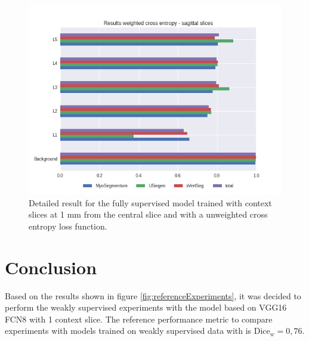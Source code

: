 \begin{figure}
    \centering
    \includegraphics[width=.95\textwidth]{images/full_perClass_perSource_notweighted.png}
    \caption{Detailed result for the fully supervised model trained with context slices at 1 mm from the central slice and with a unweighted cross entropy loss function.
    \label{fig:referencenonWeighted}}
\end{figure}



\section{Conclusion}
\par{
    Based on the results shown in figure \ref{fig:referenceExperiments}, it was decided to perform the weakly supervised experiments with the model based on VGG16 FCN8 with 1 context slice.
    The reference performance metric to compare experiments with models trained on weakly supervised data with is $\text{Dice}_w=0,76$.
}
